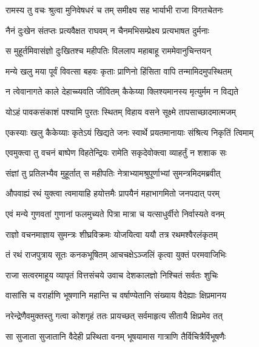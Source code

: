 
\twolineshloka
{रामस्य तु वचः श्रुत्वा मुनिवेषधरं च तम्}
{समीक्ष्य सह भार्याभी राजा विगतचेतनः} %

\twolineshloka
{नैनं दुःखेन संतप्तः प्रत्यवैक्षत राघवम्}
{न चैनमभिसम्प्रेक्ष्य प्रत्यभाषत दुर्मनाः} %

\twolineshloka
{स मुहूर्तमिवासंज्ञो दुःखितश्च महीपतिः}
{विललाप महाबाहू राममेवानुचिन्तयन्} %

\twolineshloka
{मन्ये खलु मया पूर्वं विवत्सा बहवः कृताः}
{प्राणिनो हिंसिता वापि तन्मामिदमुपस्थितम्} %

\twolineshloka
{न त्वेवानागते काले देहाच्च्यवति जीवितम्}
{कैकेय्या क्लिश्यमानस्य मृत्युर्मम न विद्यते} %

\twolineshloka
{योऽहं पावकसंकाशं पश्यामि पुरतः स्थितम्}
{विहाय वसने सूक्ष्मे तापसाच्छादमात्मजम्} %

\twolineshloka
{एकस्याः खलु कैकेय्याः कृतेऽयं खिद्यते जनः}
{स्वार्थे प्रयतमानायाः संश्रित्य निकृतिं त्विमाम्} %

\twolineshloka
{एवमुक्त्वा तु वचनं बाष्पेण विहतेन्द्रियः}
{रामेति सकृदेवोक्त्वा व्याहर्तुं न शशाक सः} %

\twolineshloka
{संज्ञां तु प्रतिलभ्यैव मुहूर्तात् स महीपतिः}
{नेत्राभ्यामश्रुपूर्णाभ्यां सुमन्त्रमिदमब्रवीत्} %

\twolineshloka
{औपवाह्यं रथं युक्त्वा त्वमायाहि हयोत्तमैः}
{प्रापयैनं महाभागमितो जनपदात् परम्} %

\twolineshloka
{एवं मन्ये गुणवतां गुणानां फलमुच्यते}
{पित्रा मात्रा च यत्साधुर्वीरो निर्वास्यते वनम्} %

\twolineshloka
{राज्ञो वचनमाज्ञाय सुमन्त्रः शीघ्रविक्रमः}
{योजयित्वा ययौ तत्र रथमश्वैरलंकृतम्} %

\twolineshloka
{तं रथं राजपुत्राय सूतः कनकभूषितम्}
{आचचक्षेऽञ्जलिं कृत्वा युक्तं परमवाजिभिः} %

\twolineshloka
{राजा सत्वरमाहूय व्यापृतं वित्तसंचये}
{उवाच देशकालज्ञो निश्चितं सर्वतः शुचिः} %

\twolineshloka
{वासांसि च वरार्हाणि भूषणानि महान्ति च}
{वर्षाण्येतानि संख्याय वैदेह्याः क्षिप्रमानय} %

\twolineshloka
{नरेन्द्रेणैवमुक्तस्तु गत्वा कोशगृहं ततः}
{प्रायच्छत् सर्वमाहृत्य सीतायै क्षिप्रमेव तत्} %

\twolineshloka
{सा सुजाता सुजातानि वैदेही प्रस्थिता वनम्}
{भूषयामास गात्राणि तैर्विचित्रैर्विभूषणैः} %

